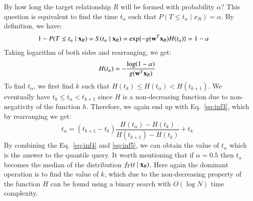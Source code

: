  By how long the target relationship $R$ will be formed with probability $\alpha$? This question is equivalent to find the time $t_\alpha$ such that $P(T \le t_\alpha\mid x_R)=\alpha$. By definition, we have:
\begin{equation*}
\begin{split}
1-P(T \le t_\alpha\mid \mathbf{x}_R)=S(t_\alpha\mid \mathbf{x}_R)&=\exp\{-g(\mathbf{w}^T\mathbf{x}_R){H}(t_\alpha)\}=1-\alpha
\end{split}
\end{equation*}
Taking logarithm of both sides and rearranging, we get:
\begin{equation}\label{eq:inf4}
{H}(t_\alpha)=-\frac{\log(1-\alpha)}{g(\mb{w}^T\mb{x}_R)}
\end{equation}
To find $t_\alpha$, we first find $k$ such that ${H}(t_k)\le{H}(t_\alpha)<{H}(t_{k+1})$.
We eventually have $t_k\le t_\alpha < t_{k+1}$ since $H$ is a non-decreasing function due to non-negativity of the function $h$. Therefore, we again end up with Eq.~\ref{eq:inf3}, which by rearranging we get:
\begin{equation}\label{eq:inf5}
t_\alpha=(t_{k+1}-t_k)\frac{{H}(t_\alpha)-{H}(t_k)}{{H}(t_{k+1})-{H}(t_k)}+t_k
\end{equation}
By combining the Eq.~\ref{eq:inf4} and \ref{eq:inf5}, we can obtain the value of $t_\alpha$ which is the answer to the quantile query. It worth mentioning that if $\alpha=0.5$ then $t_\alpha$ becomes the median of the distribution $f_T(t\mid \mathbf{x}_R)$. Here again the dominant operation is to find the value of $k$, which due to the non-decreasing property of the function ${H}$ can be found using a binary search with $O(\log N)$ time complexity.\\



